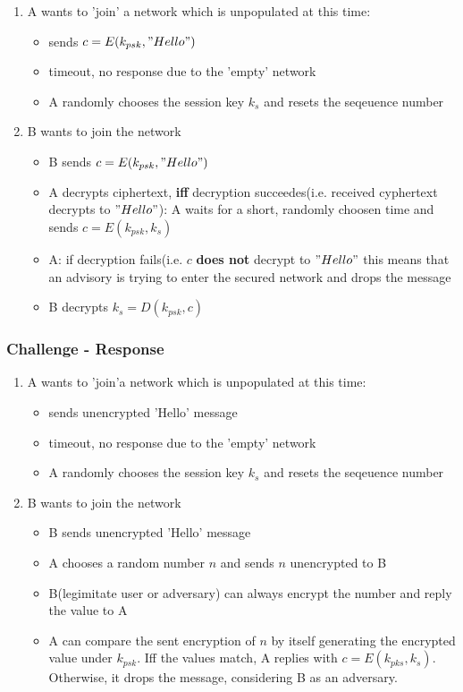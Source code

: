 \begin{enumerate}
 \item A wants to 'join' a network which is unpopulated at this time:
\begin{itemize}
 \item sends $c=E(k_{psk}, "Hello")$
 \item timeout, no response due to the 'empty' network
 \item A randomly chooses the session key $k_s$ and resets the seqeuence number
\end{itemize}
\item B wants to join the network
\begin{itemize}
 \item B sends $c=E(k_{psk}, "Hello")$
 \item A decrypts ciphertext, \textbf{iff} decryption succeedes(i.e. received cyphertext decrypts to $"Hello"$): A waits for a short, randomly choosen time and sends $c=E(k_{psk}, k_s)$
 \item A: if decryption fails(i.e. $c$ \textbf{does not} decrypt to $"Hello"$ this means
 that an advisory is trying to enter the secured network and drops the message
 \item B decrypts $k_s = D(k_{psk}, c)$
\end{itemize}
\end{enumerate}

\subsubsection{Challenge - Response}

\begin{enumerate}
 \item A wants to 'join'a network which is unpopulated at this time:
\begin{itemize}
 \item sends unencrypted 'Hello' message
 \item timeout, no response due to the 'empty' network
 \item A randomly chooses the session key $k_s$ and resets the seqeuence number
\end{itemize}
\item B wants to join the network
\begin{itemize}
 \item B sends unencrypted 'Hello' message
 \item A chooses a random number $n$ and sends $n$ unencrypted to  B
 \item B(legimitate user or adversary) can always encrypt the number and reply the value to A
 \item A can compare the sent encryption of $n$ by itself generating the encrypted value under $k_{psk}$. Iff the
 values match, A replies with $c = E(k_{pks}, k_s)$. Otherwise, it drops the message, considering B as an adversary.
\end{itemize}
\end{enumerate}

